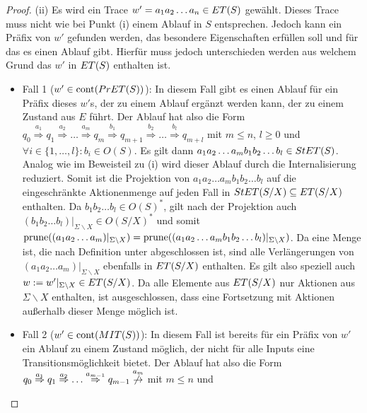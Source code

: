 \begin{proof}
  (ii)
  Es wird ein Trace $w'=a_1a_2\dots a_n\in ET{}(S)$ gewählt. Dieses Trace
  muss nicht wie bei Punkt (i) einem Ablauf in $S$ entsprechen. Jedoch kann ein
  Präfix von $w'$ gefunden werden, das besondere Eigenschaften erfüllen soll
  und für das es einen Ablauf gibt. Hierfür muss jedoch unterschieden werden
  aus welchem Grund das $w'$ in $ET{}(S)$ enthalten ist.
  \begin{itemize}
    \item Fall 1 ($w'\in\mathrm{cont}{}(PrET{}(S))$): In diesem Fall gibt es einen
      Ablauf für ein Präfix dieses $w'$s, der zu einem Ablauf ergänzt werden
      kann, der zu einem Zustand aus $E$ führt. Der Ablauf hat also die Form $q_0
      \overset{a_1}{\Rightarrow} q_1 \overset{a_2}{\Rightarrow} \dots
      \overset{a_m}{\Rightarrow} q_m \overset{b_1}{\Rightarrow} q_{m+1}
      \overset{b_2}{\Rightarrow} \dots \overset{b_l}{\Rightarrow} q_{m+l}$ mit
      $m\leq n$, $l\geq 0$ und $\forall i\in \{1,\dots ,l\}: b_i\in O(S)$. Es
      gilt dann $a_1a_2\dots a_mb_1b_2\dots b_l\in StET{}(S)$. Analog wie im
      Beweisteil zu (i) wird dieser Ablauf durch die Internalisierung
      reduziert. Somit ist die Projektion von $a_1a_2\!\dots\!
      a_mb_1b_2\!\dots\! b_l$
      auf die eingeschränkte Aktionenmenge auf jeden Fall in $StET{}(S/X)
      \subseteq ET{}(S/X)$ enthalten. Da $b_1b_2\dots b_l\in O(S)^*$, gilt
      nach der Projektion auch $(b_1b_2\dots b_l)|_{\Sigma\backslash X}\in
      O(S/X)^*$ und somit $\mathrm{prune}{}((a_1a_2\dots a_m)|_{\Sigma\backslash
      X})=\mathrm{prune}{}((a_1a_2\dots a_mb_1b_2\dots b_l)|_{\Sigma\backslash X})$. Da
      \ET{} eine Menge ist, die nach Definition unter \cont{}
      abgeschlossen ist, sind alle Verlängerungen von $(a_1a_2\dots
      a_m)|_{\Sigma\backslash X}$ ebenfalls in $ET{}(S/X)$ enthalten.
      Es gilt also speziell auch $w:=w'|_{\Sigma\backslash X}\in
      ET{}(S/X)$. Da alle Elemente aus $ET{}(S/X)$ nur Aktionen aus
      $\Sigma\backslash X$ enthalten, ist ausgeschlossen, dass eine
      Fortsetzung mit Aktionen außerhalb dieser Menge möglich ist.
    \item Fall 2 ($w'\in\mathrm{cont}{}(MIT{}(S))$): In diesem Fall ist bereits für
      ein Präfix von $w'$ ein Ablauf zu einem Zustand möglich, der nicht für
      alle Inputs eine Transitionsmöglichkeit bietet. Der Ablauf hat also die
      Form $q_0 \overset{a_1}{\Rightarrow} q_1 \overset{a_2}{\Rightarrow} \dots
      \overset{a_{m-1}}{\Rightarrow} q_{m-1}
      \overset{a_m}{\not{\hspace{-0.1cm}\rightarrow}}$ mit $m\leq n$ und

\end{itemize}
\end{proof}
